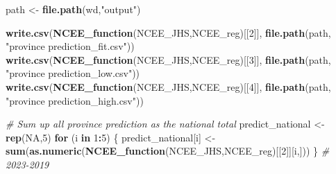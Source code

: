 \documentclass[]{article}
\newenvironment{Shaded}{\begin{snugshade}}{\end{snugshade}}
\newcommand{\KeywordTok}[1]{\textcolor[rgb]{0.13,0.29,0.53}{\textbf{#1}}}
\newcommand{\DataTypeTok}[1]{\textcolor[rgb]{0.13,0.29,0.53}{#1}}
\newcommand{\DecValTok}[1]{\textcolor[rgb]{0.00,0.00,0.81}{#1}}
\newcommand{\StringTok}[1]{\textcolor[rgb]{0.31,0.60,0.02}{#1}}
\newcommand{\CommentTok}[1]{\textcolor[rgb]{0.56,0.35,0.01}{\textit{#1}}}
\newcommand{\OtherTok}[1]{\textcolor[rgb]{0.56,0.35,0.01}{#1}}
\newcommand{\ControlFlowTok}[1]{\textcolor[rgb]{0.13,0.29,0.53}{\textbf{#1}}}
\newcommand{\OperatorTok}[1]{\textcolor[rgb]{0.81,0.36,0.00}{\textbf{#1}}}
\newcommand{\NormalTok}[1]{#1}
\begin{document}
\begin{Shaded}
\begin{Highlighting}[]
\NormalTok{path <-}\StringTok{ }\KeywordTok{file.path}\NormalTok{(wd,}\StringTok{"output"}\NormalTok{)}

\KeywordTok{write.csv}\NormalTok{(}\KeywordTok{NCEE_function}\NormalTok{(NCEE_JHS,NCEE_reg)[[}\DecValTok{2}\NormalTok{]], }\KeywordTok{file.path}\NormalTok{(path, }\StringTok{"province prediction_fit.csv"}\NormalTok{))}
\KeywordTok{write.csv}\NormalTok{(}\KeywordTok{NCEE_function}\NormalTok{(NCEE_JHS,NCEE_reg)[[}\DecValTok{3}\NormalTok{]], }\KeywordTok{file.path}\NormalTok{(path, }\StringTok{"province prediction_low.csv"}\NormalTok{))}
\KeywordTok{write.csv}\NormalTok{(}\KeywordTok{NCEE_function}\NormalTok{(NCEE_JHS,NCEE_reg)[[}\DecValTok{4}\NormalTok{]], }\KeywordTok{file.path}\NormalTok{(path, }\StringTok{"province prediction_high.csv"}\NormalTok{))}

\CommentTok{# Sum up all province prediction as the national total}
\NormalTok{predict_national <-}\StringTok{ }\KeywordTok{rep}\NormalTok{(}\OtherTok{NA}\NormalTok{,}\DecValTok{5}\NormalTok{)}
\ControlFlowTok{for}\NormalTok{ (i }\ControlFlowTok{in} \DecValTok{1}\OperatorTok{:}\DecValTok{5}\NormalTok{) \{}
\NormalTok{  predict_national[i] <-}\StringTok{ }\KeywordTok{sum}\NormalTok{(}\KeywordTok{as.numeric}\NormalTok{(}\KeywordTok{NCEE_function}\NormalTok{(NCEE_JHS,NCEE_reg)[[}\DecValTok{2}\NormalTok{]][i,]))}
\NormalTok{\} }\CommentTok{# 2023-2019}
\end{Highlighting}
\end{Shaded}

\begin{Shaded}
\end{Shaded}
\end{document}
